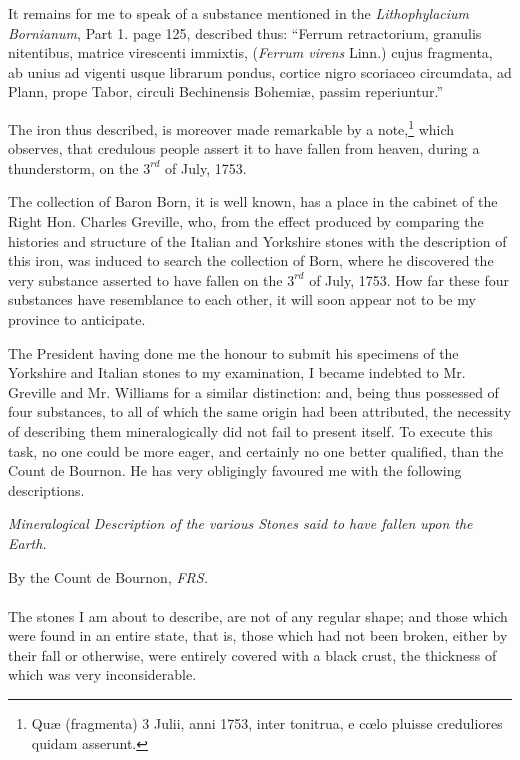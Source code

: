 \documentclass[a4paper, 12pt, oneside, twocolumn]{article}
\begin{document}
It remains for me to speak of a substance mentioned in the \emph{Lithophylacium Bornianum}, Part 1. page 125, described thus: ``Ferrum retractorium, granulis nitentibus, matrice virescenti immixtis, (\emph{Ferrum virens} Linn.) cujus fragmenta, ab unius ad vigenti usque librarum pondus, cortice nigro scoriaceo circumdata, ad Plann, prope Tabor, circuli Bechinensis Bohemiæ, passim reperiuntur.''

The iron thus described, is moreover made remarkable by a note,\footnote{Quæ (fragmenta) 3 Julii, anni 1753, inter tonitrua, e cœlo pluisse creduliores quidam asserunt.} which observes, that credulous people assert it to have fallen from heaven, during a thunderstorm, on the $3^{rd}$ of July, 1753.

The collection of Baron Born, it is well known, has a place in the cabinet of the Right Hon. Charles Greville, who, from the effect produced by comparing the histories and structure of the Italian and Yorkshire stones with the description of this iron, was induced to search the collection of Born, where he discovered the very substance asserted to have fallen on the $3^{rd}$ of July, 1753. How far these four substances have resemblance to each other, it will soon appear not to be my province to anticipate.

The President having done me the honour to submit his specimens of the Yorkshire and Italian stones to my examination, I became indebted to Mr. Greville and Mr. Williams for a similar distinction: and, being thus possessed of four substances, to all of which the same origin had been attributed, the necessity of describing them mineralogically did not fail to present itself. To execute this task, no one could be more eager, and certainly no one better qualified, than the Count de Bournon. He has very obligingly favoured me with the following descriptions.
\begin{center}
\emph{Mineralogical Description of the various Stones said to have fallen upon the Earth.}
\end{center}
\begin{center}
By the Count de Bournon, \emph{FRS.}
\end{center}
\paragraph{}
The stones I am about to describe, are not of any regular shape; and those which were found in an entire state, that is, those which had not been broken, either by their fall or otherwise, were entirely covered with a black crust, the thickness of which was very inconsiderable.
\end{document}
